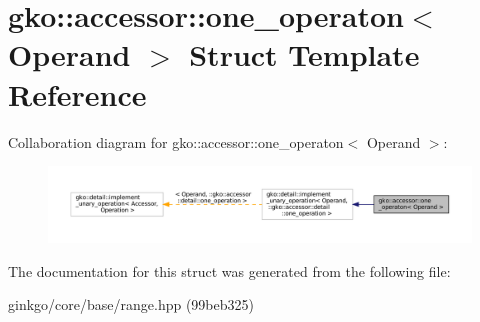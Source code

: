\hypertarget{structgko_1_1accessor_1_1one__operaton}{}\section{gko\+:\+:accessor\+:\+:one\+\_\+operaton$<$ Operand $>$ Struct Template Reference}
\label{structgko_1_1accessor_1_1one__operaton}


Collaboration diagram for gko\+:\+:accessor\+:\+:one\+\_\+operaton$<$ Operand $>$\+:
\nopagebreak
\begin{figure}[H]
\begin{center}
\leavevmode
\includegraphics[width=350pt]{structgko_1_1accessor_1_1one__operaton__coll__graph}
\end{center}
\end{figure}


The documentation for this struct was generated from the following file\+:\begin{DoxyCompactItemize}
\item 
ginkgo/core/base/range.\+hpp (99beb325)\end{DoxyCompactItemize}
